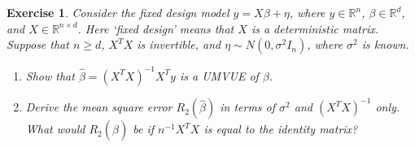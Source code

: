 \documentclass[12pt]{article}
\theoremstyle{colon}
\newtheorem{exercise}{Exercise}
\begin{document}
\clearpage

\begin{exercise}
  Consider the fixed design model $y = X \beta + \eta$, where $y \in \mathbb{R}^n$, $\beta \in \mathbb{R}^d$, and $X \in \mathbb{R}^{n \times d}$. Here `fixed design' means that $X$ is a deterministic matrix. Suppose that $n \geq d$, $X^T X$ is invertible, and $\eta \sim N(0, \sigma^2 I_n)$, where $\sigma^2$ is known.
  \begin{enumerate}[label=\arabic*)]
    \item Show that $\widehat{\beta} = (X^T X)^{-1} X^T y$ is a UMVUE of $\beta$.
    \item Derive the mean square error $R_2(\widehat{\beta})$ in terms of $\sigma^2$ and $(X^T X)^{-1}$ only. What would $R_2(\widehat{\beta})$ be if $n^{-1} X^T X$ is equal to the identity matrix?
  \end{enumerate}
\end{exercise}
\end{document}
